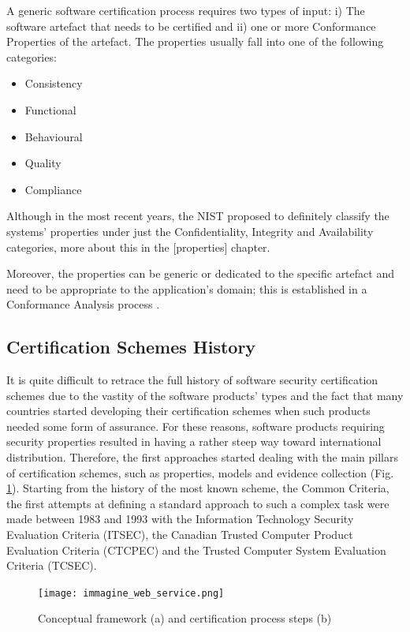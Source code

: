 A generic software certification process requires two types of input: i) The software artefact that needs to be certified and ii) one or more Conformance Properties of the artefact. The properties usually fall into one of the following categories:

\begin{itemize}
    \item Consistency
    \item Functional
    \item Behavioural
    \item Quality
    \item Compliance 
\end{itemize}

Although in the most recent years, the NIST proposed to definitely classify the systems' properties under just the Confidentiality, Integrity and Availability categories, more about this in the [properties] chapter. 

Moreover, the properties can be generic or dedicated to the specific artefact and need to be appropriate to the application's domain; this is established in a Conformance Analysis process \cite{anisetti2017semi}.


\subsection{Certification Schemes History}
It is quite difficult to retrace the full history of software security certification schemes due to the vastity of the software products' types and the fact that many countries started developing their certification schemes when such products needed some form of assurance. For these reasons, software products requiring security properties resulted in having a rather steep way toward international distribution. Therefore, the first approaches started dealing with the main pillars of certification schemes, such as properties, models and evidence collection (Fig. \ref{Fig:OldProcess}). Starting from the history of the most known scheme, the Common Criteria, the first attempts at defining a standard approach to such a complex task were made between 1983 and 1993 with the Information Technology Security Evaluation Criteria (ITSEC), the Canadian Trusted Computer Product Evaluation Criteria (CTCPEC) and the Trusted Computer System Evaluation Criteria (TCSEC).
\begin{figure}[htb]
\texttt{[image: immagine\_web\_service.png]}
\caption{Conceptual framework (a) and certification process steps (b) \cite{anisetti2013test}}
\label{Fig:OldProcess}
\end{figure}
